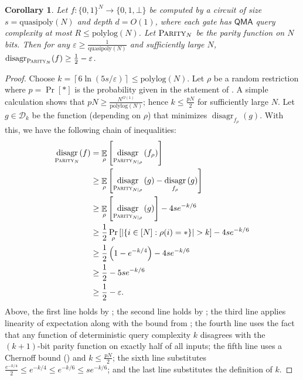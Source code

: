 \documentclass[10pt,a4paper]{article}
\newtheorem{corollary}[theorem]{Corollary}
\newcommand{\eps}{\varepsilon}
\newcommand{\E}{\mathop{\mathbb{E}}}
\newcommand{\polylog}{\mathrm{polylog}}
\newcommand{\quasipoly}{\mathrm{quasipoly}}
\newcommand{\PARITY}{\normalfont\textsc{Parity}}
\DeclareMathOperator{\disagr}{\mathrm{disagr}}
\begin{document}
\begin{corollary}
\label{cor:qmah_parity_disagreement}
Let $f: \{0,1\}^N \to \{0,1,\bot\}$ be computed by a circuit of size $s = \quasipoly(N)$ and depth $d = O(1)$, where each gate has $\mathsf{QMA}$ query complexity at most $R \le \polylog(N)$. Let $\PARITY_N$ be the parity function on $N$ bits. Then for any $\eps \ge \frac{1}{\quasipoly(N)}$ and sufficiently large $N$, $\disagr_{\PARITY_N}(f) \ge \frac{1}{2} - \eps$.
\end{corollary}
\begin{proof}
Choose $k = \left\lceil 6\ln\left(5s/\eps\right)\right\rceil \le \polylog(N)$. Let $\rho$ be a random restriction where $p = \Pr[*]$ is the probability given in the statement of . A simple calculation shows that $pN \ge \frac{N^{\Omega(1)}}{\polylog(N)}$; hence $k \le \frac{pN}{2}$ for sufficiently large $N$. Let $g \in \mathcal{D}_k$ be the function (depending on $\rho$) that minimizes $\disagr_{f_\rho}(g)$. With this, we have the following chain of inequalities:
\begin{align*}
\disagr_{\PARITY_N}(f)
&= \E_\rho\left[\disagr_{\PARITY_{N|\rho}}\left(f_\rho\right)\right]\\
&\ge \E_\rho\left[\disagr_{\PARITY_{N|\rho}}\left(g\right) - \disagr_{f_\rho}\left(g\right)\right]\\
&\ge \E_\rho\left[\disagr_{\PARITY_{N|\rho}}\left(g\right)\right] - 4se^{-k/6}\\
&\ge \frac{1}{2}\Pr_\rho\left[|\{i \in [N]: \rho(i) = *\}| > k\right] - 4se^{-k/6}\\
&\ge \frac{1}{2}\left(1 - e^{-k/4}\right) - 4se^{-k/6}\\
&\ge \frac{1}{2} - 5se^{-k/6}\\
&\ge \frac{1}{2} - \eps.
\end{align*}
Above, the first line holds by ; the second line holds by ; the third line applies linearity of expectation along with the bound from ; the fourth line uses the fact that any function of deterministic query complexity $k$ disagrees with the $(k+1)$-bit parity function on exactly half of all inputs; the fifth line uses a Chernoff bound () and $k \le \frac{pN}{2}$; the sixth line substitutes $\frac{e^{-k/4}}{2} \le e^{-k/4} \le e^{-k/6} \le se^{-k/6}$; and the last line substitutes the definition of $k$.
\end{proof}
\end{document}
